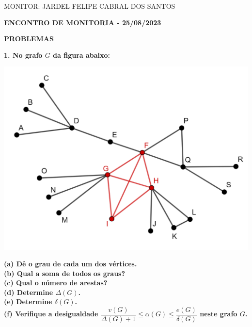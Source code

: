 \documentclass[12pt, a4paper]{article}
\begin{document}
\begin{flushleft}

MONITOR: JARDEL FELIPE CABRAL DOS SANTOS\\[1cm] 
\end{flushleft}

\begin{center} \textbf{ENCONTRO DE MONITORIA - 25/08/2023\\[1cm]}
\end{center}

\begin{center}
\textbf{PROBLEMAS}
\end{center}


\textbf{1. No grafo \(G\) da figura abaixo:} 

\begin{center}
\includegraphics[scale=0.75]{grafo.png}
\end{center}

\textbf{(a) Dê o grau de cada um dos vértices.}\\

\textbf{(b) Qual a soma de todos os graus?} \\

\textbf{(c) Qual o número de arestas?} \\

\textbf{(d) Determine \(\Delta(G)\).} \\

\textbf{(e) Determine \(\delta(G)\).} \\

\textbf{(f) Verifique a desigualdade \(\dfrac{v(G)}{\Delta(G) + 1} \leq \alpha(G) \leq \dfrac{e(G)}{\delta(G)}\) neste grafo \(G\).} \\
\end{document}
